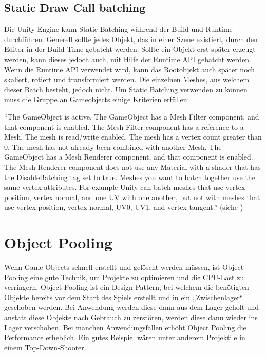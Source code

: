 \subsection{Static Draw Call batching}
Die Unity Engine kann Static Batching während der Build und Runtime durchführen. Generell sollte jedes Objekt, das in einer Szene existiert, durch den Editor in der Build Time gebatcht werden. Sollte ein Objekt erst später erzeugt werden, kann dieses jedoch auch, mit Hilfe der Runtime API gebatcht werden. Wenn die Runtime API verwendet wird, kann das Rootobjekt auch später noch skaliert, rotiert und transformiert werden. Die einzelnen Meshes, aus welchem dieser Batch besteht, jedoch nicht. Um Static Batching verwenden zu können muss die Gruppe an Gameobjects einige Kriterien erfüllen:

"`The GameObject is active.
The GameObject has a Mesh Filter
component, and that component is enabled.
The Mesh Filter component has a reference to a Mesh.
The mesh is read/write enabled.
The mesh has a vertex count greater than 0.
The mesh has not already been combined with another Mesh.
The GameObject has a Mesh Renderer
component, and that component is enabled.
The Mesh Renderer component does not use any Material with a shader
that has the DisableBatching tag set to true.
Meshes you want to batch together use the same vertex attributes. For example Unity can batch meshes that use vertex position, vertex normal, and one UV with one another, but not with meshes that use vertex position, vertex normal, UV0, UV1, and vertex tangent."'
(siehe \cite{_drawcallbatching})


\section{Object Pooling}
Wenn Game Objects schnell erstellt und gelöscht werden müssen, ist Object Pooling eine gute Technik, um Projekte zu optimieren und die CPU-Last zu verringern. Object Pooling ist ein Design-Pattern, bei welchem die benötigten Objekte bereits vor dem Start des Spiels erstellt und in ein „Zwischenlager“ geschoben werden. Bei Anwendung werden diese dann aus dem Lager geholt und anstatt diese Objekte nach Gebrauch zu zerstören, werden diese dann wieder ins Lager verschoben. Bei manchen Anwendungsfällen erhöht Object Pooling die Performance erheblich. Ein gutes Beispiel wären unter anderem Projektile in einem Top-Down-Shooter.
\cite{_objectpooling}

